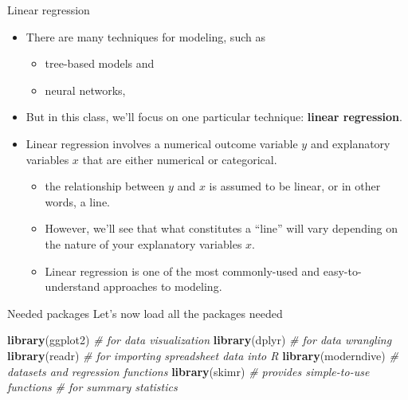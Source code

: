 \documentclass[
  ignorenonframetext,
]{beamer}
\newenvironment{Shaded}{\begin{snugshade}}{\end{snugshade}}
\newcommand{\CommentTok}[1]{\textcolor[rgb]{0.56,0.35,0.01}{\textit{#1}}}
\newcommand{\FunctionTok}[1]{\textcolor[rgb]{0.13,0.29,0.53}{\textbf{#1}}}
\newcommand{\NormalTok}[1]{#1}
\providecommand{\tightlist}{%
  \setlength{\itemsep}{0pt}\setlength{\parskip}{0pt}}
\begin{document}
\begin{frame}{Linear regression}
\protect{}\label{linear-regression}
\begin{itemize}
\item
  There are many techniques for modeling, such as

  \begin{itemize}
  \tightlist
  \item
    tree-based models and
  \item
    neural networks,
  \end{itemize}
\item
  But in this class, we'll focus on one particular technique:
  \textbf{linear regression}.
\item
  Linear regression involves a numerical outcome variable \(y\) and
  explanatory variables \(x\) that are either numerical or categorical.

  \begin{itemize}
  \tightlist
  \item
    the relationship between \(y\) and \(x\) is assumed to be linear, or
    in other words, a line.
  \item
    However, we'll see that what constitutes a ``line'' will vary
    depending on the nature of your explanatory variables \(x\).
  \item
    Linear regression is one of the most commonly-used and
    easy-to-understand approaches to modeling.
  \end{itemize}
\end{itemize}
\end{frame}

\begin{frame}[fragile]{Needed packages}
\protect{}\label{needed-packages}
Let's now load all the packages needed

\normalsize

\begin{Shaded}
\begin{Highlighting}[]
\FunctionTok{library}\NormalTok{(ggplot2)    }\CommentTok{\#  for data visualization}
\FunctionTok{library}\NormalTok{(dplyr)      }\CommentTok{\#  for data wrangling}
\FunctionTok{library}\NormalTok{(readr)      }\CommentTok{\#  for importing spreadsheet data into R}
\FunctionTok{library}\NormalTok{(moderndive) }\CommentTok{\#  datasets and regression functions}
\FunctionTok{library}\NormalTok{(skimr)      }\CommentTok{\#  provides simple{-}to{-}use functions }
                    \CommentTok{\#  for summary statistics}
\end{Highlighting}
\end{Shaded}

\normalsize
\end{frame}
\end{document}
